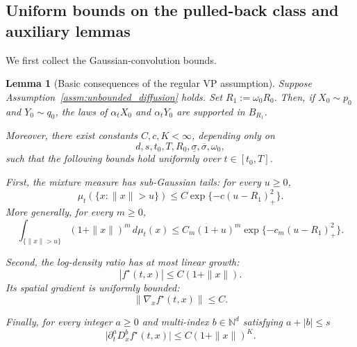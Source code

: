 \documentclass[11pt]{article}
\theoremstyle{plain}
\newtheorem{lemma}[theorem]{Lemma}
\theoremstyle{definition}
\theoremstyle{remark}
\begin{document}
\subsection{Uniform bounds on the pulled-back class and auxiliary lemmas}
\label{subsec:uniform-bound}

We first collect the
 Gaussian-convolution bounds.
\begin{lemma}[Basic consequences of the regular VP assumption]
\label{lem:global-linear-growth}
Suppose Assumption~\ref{assm:unbounded_diffusion} holds.
Set
$
R_1:=\omega_0R_0.
$
Then, if \(X_0\sim p_0\) and \(Y_0\sim q_0\), the laws of
\(\alpha_tX_0\) and \(\alpha_tY_0\) are supported in \(B_{R_1}\).

Moreover, there exist constants \(C,c,K<\infty\), depending only on
\[
d,s,t_0,T,R_0,\underline\sigma,\overline\sigma,\omega_0,
\]
such that the following bounds hold uniformly over \(t\in[t_0,T]\).

First, the mixture measure has sub-Gaussian tails: for every \(u\ge0\),
\begin{equation}
\label{eq:vp_tail_bound}
\mu_t(\{x:\|x\|>u\})
\le
C\exp\{-c(u-R_1)_+^2\}.
\end{equation}
More generally, for every \(m\ge0\),
\begin{equation}
\label{eq:vp_tail_moment_bound}
\int_{\{\|x\|>u\}}(1+\|x\|)^m\,d\mu_t(x)
\le
C_m(1+u)^m\exp\{-c_m(u-R_1)_+^2\}.
\end{equation}

Second, the log-density ratio has at most linear growth:
\begin{equation}
\label{eq:vp_fstar_growth}
|f^\star(t,x)|
\le
C(1+\|x\|).
\end{equation}
Its spatial gradient is uniformly bounded:
\begin{equation}
\label{eq:vp_fstar_grad_bound}
\|\nabla_x f^\star(t,x)\|
\le
C.
\end{equation}

Finally, for every integer \(a\ge0\) and multi-index
\(b\in\mathbb N^d\) satisfying \(a+|b|\le s\)
\begin{equation}
\label{eq:vp_time_space_derivative_growth}
\big|\partial_t^aD_x^b f^\star(t,x)\big|
\le
C(1+\|x\|)^K.
\end{equation}
\end{lemma}
\end{document}
